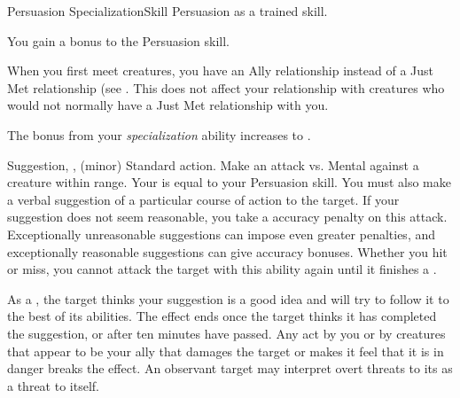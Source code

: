     \begin{feat}{Persuasion Specialization}{Skill}
        \featpre Persuasion as a trained skill.

         You gain a  bonus to the Persuasion skill.

         When you first meet creatures, you have an Ally relationship instead of a Just Met relationship (see .
        This does not affect your relationship with creatures who would not normally have a Just Met relationship with you.

         The bonus from your \textit{specialization} ability increases to .

        \begin{sustainability}{Suggestion}{, ,  (minor)}
            \abilityusagetime Standard action.
            \rankline
            Make an attack vs. Mental against a creature within \rngmed range.
            Your  is equal to your Persuasion skill.
            You must also make a verbal suggestion of a particular course of action to the target.
            If your suggestion does not seem reasonable, you take a  accuracy penalty on this attack.
            Exceptionally unreasonable suggestions can impose even greater penalties, and exceptionally reasonable suggestions can give accuracy bonuses.
            Whether you hit or miss, you cannot attack the target with this ability again until it finishes a .

            \hit As a , the target thinks your suggestion is a good idea and will try to follow it to the best of its abilities.
            The effect ends once the target thinks it has completed the suggestion, or after ten minutes have passed.
            Any act by you or by creatures that appear to be your ally that damages the target or makes it feel that it is in danger breaks the effect.
            An observant target may interpret overt threats to its  as a threat to itself.
        \end{sustainability}
    \end{feat}

